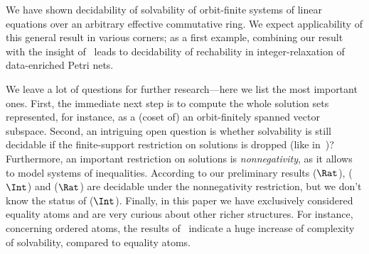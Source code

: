 We have shown decidability of solvability of orbit-finite systems of linear equations over an arbitrary effective commutative ring.
We expect applicability of this general result in various corners; as a first example, 
combining our result with the insight of~\cite{HR21} leads to decidability of rechability
in integer-relaxation of data-enriched Petri nets. 

We leave a lot of questions for further research---here we list the most important ones.
First, the immediate next step is to compute the whole solution sets represented, for instance, as a (coset of)
an orbit-finitely spanned vector subspace.
Second, an intriguing open question is whether solvability is still decidable if the finite-support restriction on solutions is dropped
(like in~\cite{DBLP:conf/lics/KlinKOT15})?
Furthermore, an important restriction on solutions is \emph{nonnegativity}, as it allows to model systems of inequalities.
According to our preliminary results \finsolvname($\Rat$), \finsolvname($\Int$) and \solvname($\Rat$) 
are decidable under the nonnegativity restriction, 
but we don't know the status of  \solvname($\Int$).
Finally, in this paper we have exclusively considered equality atoms and are very curious about other richer structures.
For instance, concerning ordered atoms, the results of~\cite{HL18} indicate a huge increase of complexity of
 solvability,  compared to equality atoms.





\newpage
%


\appendix


